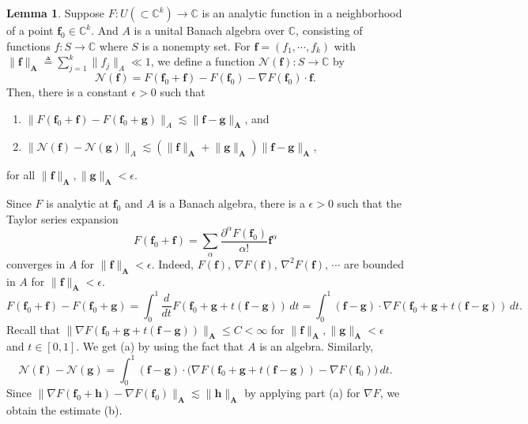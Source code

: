 \documentclass[11pt]{article}
\makeatletter
\renewenvironment{proof}[1][\proofname]{\par
  \vspace{-.7\topsep}%
  \pushQED{\qed}%
  \normalfont
  \topsep0pt \partopsep0pt %
  \trivlist
  \item[\hskip\labelsep
        \itshape
    #1\@addpunct{.}]\ignorespaces
}{%
  \popQED\endtrivlist\@endpefalse
  \addvspace{6pt plus 6pt} %
}
\theoremstyle{definition}
\newtheorem{lemma}[theorem]{Lemma}
\theoremstyle{remark}
\numberwithin{equation}{section}
\newcommand{\mbf}{\mathbf}
\newcommand{\mbb}{\mathbb}
\newcommand{\mcal}{\mathcal}
\newcommand{\C}{\mbb{C}}
\newcommand{\del}{\partial}
\newcommand{\grad}{\nabla}
\newcommand{\norm}[1]{\lVert #1 \rVert}
\makeatother
\begin{document}
\begin{lemma} \label{lem:5.3}
Suppose $F : U (\subset \C^k) \to \C$ is an analytic function in a neighborhood of a point $\mbf{f}_0 \in \C^k$. And $A$ is a unital Banach algebra over $\C$, consisting of functions $f: S \to \C$ where $S$ is a nonempty set. For $\mbf{f} = (f_1, \cdots, f_k)$ with $\norm{\mbf{f}}_{\mbf{A}} \triangleq \sum_{j=1}^k \norm{f_j}_A \ll 1$, we define a function $\mcal{N}(\mbf{f}) : S \to \C$ by
\[\mcal{N}(\mbf{f}) = F(\mbf{f}_0 + \mbf{f}) - F(\mbf{f}_0) - \grad F(\mbf{f}_0) \cdot \mbf{f}.\]
Then, there is a constant $\epsilon > 0$ such that
\vspace{-.5em}\begin{enumerate}[label=(\alph*)]
    \item $\norm{F(\mbf{f}_0 + \mbf{f}) - F(\mbf{f}_0 + \mbf{g})}_A \lesssim \norm{\mbf{f} - \mbf{g}}_{\mbf{A}}$, and
    \item $\norm{\mcal{N}(\mbf{f}) - \mcal{N}(\mbf{g})}_A \lesssim (\norm{\mbf{f}}_{\mbf{A}} + \norm{\mbf{g}}_{\mbf{A}}) \norm{\mbf{f} - \mbf{g}}_{\mbf{A}}$,
\end{enumerate}
\vspace{-.5em} for all $\norm{\mbf{f}}_{\mbf{A}}, \norm{\mbf{g}}_{\mbf{A}} < \epsilon$.
\end{lemma}
\begin{proof}
Since $F$ is analytic at $\mbf{f}_0$ and $A$ is a Banach algebra, there is a $\epsilon > 0$ such that the Taylor series expansion
\[F(\mbf{f}_0 + \mbf{f}) = \sum_{\alpha} \frac{\del^\alpha F(\mbf{f}_0)}{\alpha !} \mbf{f}^\alpha\]
converges in $A$ for $\norm{\mbf{f}}_{\mbf{A}} < \epsilon$. Indeed, $F(\mbf{f})$, $\grad F(\mbf{f})$, $\grad^2 F(\mbf{f})$, $\cdots$ are bounded in $A$ for $\norm{\mbf{f}}_{\mbf{A}} < \epsilon$.
\[F(\mbf{f}_0 + \mbf{f}) - F(\mbf{f}_0 + \mbf{g}) = \int_0^1 \frac{d}{dt} F(\mbf{f}_0 + \mbf{g} + t(\mbf{f} - \mbf{g})) \,dt = \int_0^1 (\mbf{f} - \mbf{g}) \cdot \grad F(\mbf{f}_0 + \mbf{g} + t(\mbf{f} - \mbf{g})) \,dt.\]
Recall that $\norm{\grad F(\mbf{f}_0 + \mbf{g} + t(\mbf{f} - \mbf{g}))}_{\mbf{A}} \leq C < \infty$ for $\norm{\mbf{f}}_{\mbf{A}}, \norm{\mbf{g}}_{\mbf{A}} < \epsilon$ and $t\in [0,1]$. We get (a) by using the fact that $A$ is an algebra. Similarly,
\[\mcal{N}(\mbf{f}) - \mcal{N}(\mbf{g}) = \int_0^1 (\mbf{f} - \mbf{g}) \cdot \big(\grad F(\mbf{f}_0 + \mbf{g} + t(\mbf{f} - \mbf{g})) - \grad F(\mbf{f}_0)\big) \,dt. \]
Since $\norm{\grad F(\mbf{f}_0 + \mbf{h}) - \grad F(\mbf{f}_0)}_{\mbf{A}} \lesssim \norm{\mbf{h}}_{\mbf{A}}$ by applying part (a) for $\grad F$, we obtain the estimate (b).
\end{proof}
\end{document}
